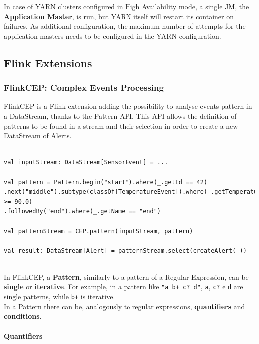 In case of YARN clusters configured in High Availability mode, a single JM, the \textbf{Application Master}, is run, but YARN itself will restart its container on failures. As additional configuration, the maximum number of attempts for the application masters needs to be configured in the YARN configuration.

\subsection{Flink Extensions} \label{FlinkLibs}

\subsubsection{FlinkCEP: Complex Events Processing}

FlinkCEP is a Flink extension adding the possibility to analyse events pattern in a DataStream, thanks to the Pattern API. This API allows the definition of patterns to be found in a stream and their selection in order to create a new DataStream of Alerts.\\


\begin{code}
\label{code:pattern-example}
\begin{verbatim}

val inputStream: DataStream[SensorEvent] = ...

val pattern = Pattern.begin("start").where(_.getId == 42)
.next("middle").subtype(classOf[TemperatureEvent]).where(_.getTemperature >= 90.0)
.followedBy("end").where(_.getName == "end")

val patternStream = CEP.pattern(inputStream, pattern)

val result: DataStream[Alert] = patternStream.select(createAlert(_))
\end{verbatim}
\end{code}~\\

In FlinkCEP, a \textbf{Pattern}, similarly to a pattern of a Regular Expression, can be \textbf{single} or \textbf{iterative}. For example, in a pattern like \texttt{"a b+ c? d"}, \texttt{a}, \texttt{c?} e \texttt{d} are single patterns, while \texttt{b+} is iterative.
\\
In a Pattern there can be, analogously to regular expressions, \textbf{quantifiers} and \textbf{conditions}.

\paragraph{Quantifiers}

